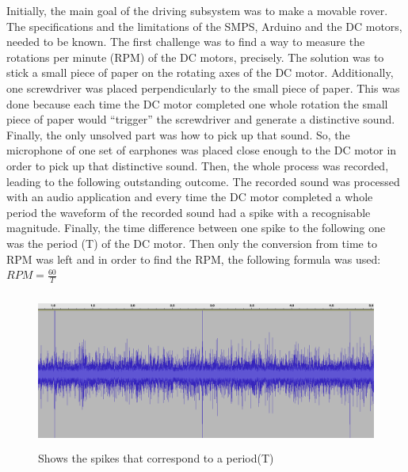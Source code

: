 \documentclass[a4paper]{article}
\begin{document}
Initially, the main goal of the driving subsystem was to make a movable rover. 
The specifications and the limitations of the SMPS, Arduino and the DC motors, 
needed to be known.  The first challenge was to find a way to measure the 
rotations per minute (RPM) of the DC motors, precisely. The solution was to 
stick a small piece of paper on the rotating axes of the DC motor. Additionally,
one screwdriver was placed perpendicularly to the small piece of paper. This was
done because each time the DC motor completed one whole rotation the small piece
of paper would ``trigger'' the screwdriver and generate a distinctive sound.
Finally, the only unsolved part was how to pick up that sound. So, the 
microphone of one set of earphones was placed close enough to the DC motor in order 
to pick up that distinctive sound. Then, the whole process was recorded, leading 
to the following outstanding outcome. The recorded sound was processed with an 
audio application and every time the DC motor completed a whole period the 
waveform of the recorded sound had a spike with a recognisable magnitude. 
Finally, the time difference between one spike to the following one was the 
period (T) of the DC motor. 
Then only the conversion from time to RPM was left and in order to find the RPM,
the following formula was used: \( RPM=\frac{60}{T} \) 


\begin{figure}[H]
\begin{Center}
\advance\leftskip 0.23in		
    \includegraphics[width=5.06in,height=2.02in]{./media/image2.png}
	\caption{Shows the spikes that correspond to a period(T)}
		\label{Shows the spikes that correspond to a period(T)}
\end{Center}
\end{figure}


\end{document}
